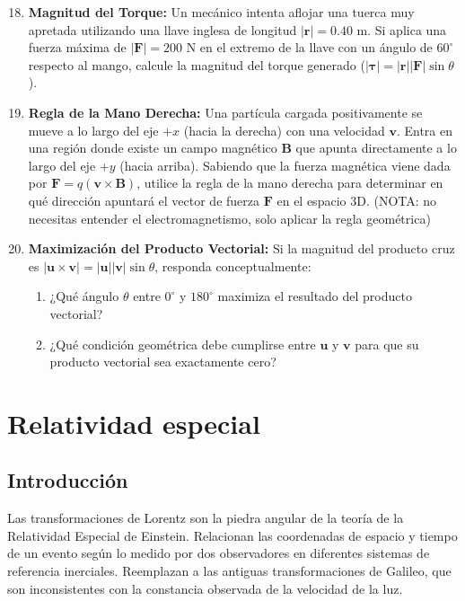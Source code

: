 \documentclass[11pt,a4paper]{book}
\begin{document}
\begin{enumerate}
    \setcounter{enumi}{17}
    \item \textbf{Magnitud del Torque:} Un mecánico intenta aflojar una tuerca muy apretada utilizando una llave inglesa de longitud $|\boldsymbol{r}| = 0.40 \text{ m}$. Si aplica una fuerza máxima de $|\boldsymbol{F}| = 200 \text{ N}$ en el extremo de la llave con un ángulo de $60^\circ$ respecto al mango, calcule la magnitud del torque generado ($|\boldsymbol{\tau}| = |\boldsymbol{r}| |\boldsymbol{F}| \sin\theta$).
    
    \item \textbf{Regla de la Mano Derecha:} Una partícula cargada positivamente se mueve a lo largo del eje $+x$ (hacia la derecha) con una velocidad $\boldsymbol{v}$. Entra en una región donde existe un campo magnético $\boldsymbol{B}$ que apunta directamente a lo largo del eje $+y$ (hacia arriba). Sabiendo que la fuerza magnética viene dada por $\boldsymbol{F} = q(\boldsymbol{v} \times \boldsymbol{B})$, utilice la regla de la mano derecha para determinar en qué dirección apuntará el vector de fuerza $\boldsymbol{F}$ en el espacio 3D. (NOTA: no necesitas entender el electromagnetismo, solo aplicar la regla geométrica)
    
    \item \textbf{Maximización del Producto Vectorial:} Si la magnitud del producto cruz es $|\boldsymbol{u} \times \boldsymbol{v}| = |\boldsymbol{u}| |\boldsymbol{v}| \sin\theta$, responda conceptualmente: 
    \begin{enumerate}
        \item ¿Qué ángulo $\theta$ entre $0^\circ$ y $180^\circ$ maximiza el resultado del producto vectorial?
        \item ¿Qué condición geométrica debe cumplirse entre $\boldsymbol{u}$ y $\boldsymbol{v}$ para que su producto vectorial sea exactamente cero?
    \end{enumerate}

\end{enumerate}


\chapter{Relatividad especial}
\label{chap:relatividad}

\section{Introducción}
Las transformaciones de Lorentz son la piedra angular de la teoría de la Relatividad Especial de Einstein. Relacionan las coordenadas de espacio y tiempo de un evento según lo medido por dos observadores en diferentes sistemas de referencia inerciales. Reemplazan a las antiguas transformaciones de Galileo, que son inconsistentes con la constancia observada de la velocidad de la luz.
\end{document}
